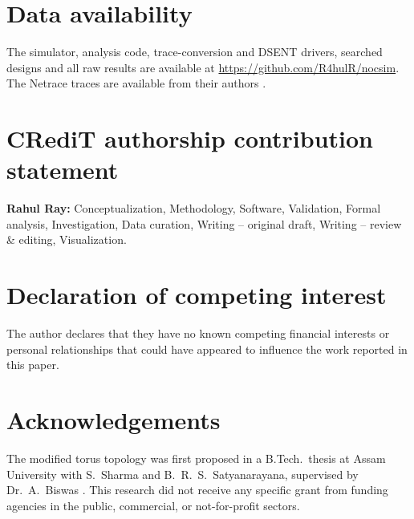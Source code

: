 \documentclass[preprint,12pt,a4paper]{elsarticle}
\begin{document}
\section*{Data availability}
The simulator, analysis code, trace-conversion and DSENT drivers, searched
designs and all raw results are available at
\url{https://github.com/R4hulR/nocsim}. The Netrace traces are available
from their authors \cite{netrace}.

\section*{CRediT authorship contribution statement}
\textbf{Rahul Ray:} Conceptualization, Methodology, Software, Validation,
Formal analysis, Investigation, Data curation, Writing -- original draft,
Writing -- review \& editing, Visualization.

\section*{Declaration of competing interest}
The author declares that they have no known competing financial interests
or personal relationships that could have appeared to influence the work
reported in this paper.

\section*{Acknowledgements}
The modified torus topology was first proposed in a B.Tech.\ thesis at
Assam University with S.~Sharma and B.~R.~S.~Satyanarayana, supervised by
Dr.~A.~Biswas \cite{thesis2023}. This research did not receive any specific
grant from funding agencies in the public, commercial, or not-for-profit
sectors.



\end{document}
